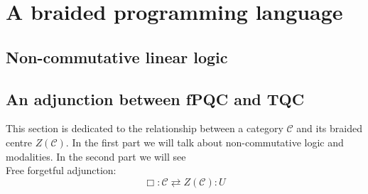 \documentclass{article}
\begin{document}


\section{A braided programming language}


\subsection{Non-commutative linear logic}



\subsection{An adjunction between fPQC and TQC}
This section is dedicated to the relationship between a category $\mathcal{C}$ and its braided centre $Z(\mathcal{C})$. In the first part we will talk about non-commutative logic and modalities. In the second part we will see \\

Free forgetful adjunction:
$$\Box: \mathcal{C} \rightleftarrows Z(\mathcal{C}):U$$ \\
\end{document}
